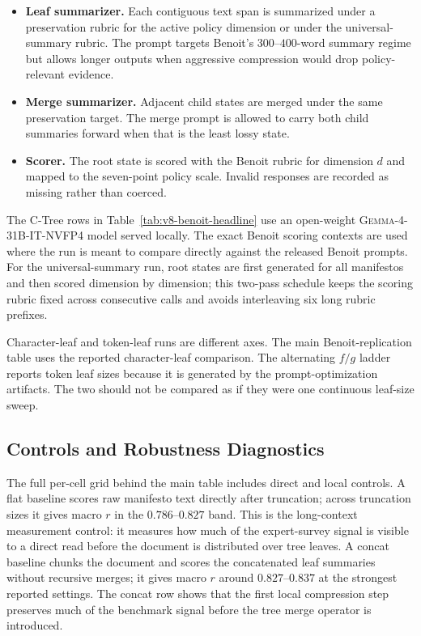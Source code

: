 \begin{itemize}[leftmargin=1.5em]
    \item \textbf{Leaf summarizer.} Each contiguous text span is summarized
          under a preservation rubric for the active policy dimension or under
          the universal-summary rubric. The prompt targets Benoit's
          \(300\)--\(400\)-word summary regime but allows longer outputs when
          aggressive compression would drop policy-relevant evidence.
    \item \textbf{Merge summarizer.} Adjacent child states are merged under the
          same preservation target. The merge prompt is allowed to carry both
          child summaries forward when that is the least lossy state.
    \item \textbf{Scorer.} The root state is scored with the Benoit rubric for
          dimension \(d\) and mapped to the seven-point policy scale. Invalid
          responses are recorded as missing rather than coerced.
\end{itemize}

The C-Tree rows in Table~\ref{tab:v8-benoit-headline} use an open-weight
\textsc{Gemma-4-31B-IT-NVFP4} model served locally. The exact Benoit scoring
contexts are used where the run is meant to compare directly against the
released Benoit prompts. For the universal-summary run, root states are first
generated for all manifestos and then scored dimension by dimension; this
two-pass schedule keeps the scoring rubric fixed across consecutive calls and
avoids interleaving six long rubric prefixes.

Character-leaf and token-leaf runs are different axes. The main
Benoit-replication table uses the reported character-leaf comparison. The
alternating \(f/g\) ladder reports token leaf sizes because it is generated by
the prompt-optimization artifacts. The two should not be compared as if they
were one continuous leaf-size sweep.

\subsection{Controls and Robustness Diagnostics}

The full per-cell grid behind the main table includes direct and local
controls. A flat baseline scores raw manifesto text directly after truncation;
across truncation sizes it gives macro \(r\) in the \(0.786\)--\(0.827\) band.
This is the long-context measurement control: it measures how much of the
expert-survey signal is visible to a direct read before the document is
distributed over tree leaves. A concat baseline chunks the document and scores
the concatenated leaf summaries without recursive merges; it gives macro
\(r\) around \(0.827\)--\(0.837\) at the strongest reported settings. The
concat row shows that the first local compression step preserves much of the
benchmark signal before the tree merge operator is introduced.

